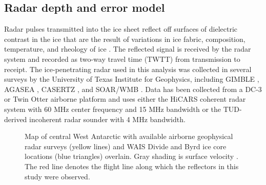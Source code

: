\subsection{Radar depth and error model}
 Radar pulses transmitted into the ice sheet reflect off surfaces of dielectric contrast in the ice that are the result of variations in ice fabric, composition, temperature, and rheology of ice \citep{fujita2000}. The reflected signal is received by the radar system and recorded as two-way travel time (TWTT) from transmission to receipt.  The ice-penetrating radar used in this analysis was collected in several surveys by the University of Texas Institute for Geophysics, including GIMBLE \citep{wais2016}, AGASEA \citep{holt2006}, CASERTZ \citep{morse2002}, and SOAR/WMB \citep{luyendyk2003}. Data has been collected from a DC-3 or Twin Otter airborne platform and uses either the HiCARS coherent radar system with 60 MHz center frequency and 15 MHz bandwidth \citep{peters2005} or the TUD-derived incoherent radar sounder \citep{blankenship2001} with 4 MHz bandwidth.


\begin{figure}[h]\label{fig:radarmap}
\centering
{}
\caption{Map of central West Antarctic with available airborne geophysical radar surveys (yellow lines) and  WAIS Divide and Byrd ice core locations (blue triangles) overlain. Gray shading is surface velocity \citep{rignot2011}. The red line denotes the flight line along which the reflectors in this study were observed. }
\end{figure}



